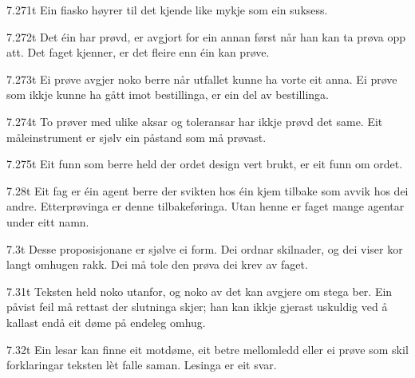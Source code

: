 \begin{formproposition}{7.271}{t}
Ein fiasko høyrer til det kjende like mykje som ein suksess.
\end{formproposition}

\begin{formproposition}{7.272}{t}
Det éin har prøvd, er avgjort for ein annan først når han kan ta prøva opp att. Det faget kjenner, er det fleire enn éin kan prøve.
\end{formproposition}

\begin{formproposition}{7.273}{t}
Ei prøve avgjer noko berre når utfallet kunne ha vorte eit anna. Ei prøve som ikkje kunne ha gått imot bestillinga, er ein del av bestillinga.
\end{formproposition}

\begin{formproposition}{7.274}{t}
To prøver med ulike aksar og toleransar har ikkje prøvd det same. Eit måleinstrument er sjølv ein påstand som må prøvast.
\end{formproposition}

\begin{formproposition}{7.275}{t}
Eit funn som berre held der ordet design vert brukt, er eit funn om ordet.
\end{formproposition}

\begin{formproposition}{7.28}{t}
Eit fag er éin agent berre der svikten hos éin kjem tilbake som avvik hos dei andre. Etterprøvinga er denne tilbakeføringa. Utan henne er faget mange agentar under eitt namn.
\end{formproposition}

\begin{formproposition}{7.3}{t}
Desse proposisjonane er sjølve ei form. Dei ordnar skilnader, og dei viser kor langt omhugen rakk. Dei må tole den prøva dei krev av faget.
\end{formproposition}

\begin{formproposition}{7.31}{t}
Teksten held noko utanfor, og noko av det kan avgjere om stega ber. Ein påvist feil må rettast der slutninga skjer; han kan ikkje gjerast uskuldig ved å kallast endå eit døme på endeleg omhug.
\end{formproposition}

\begin{formproposition}{7.32}{t}
Ein lesar kan finne eit motdøme, eit betre mellomledd eller ei prøve som skil forklaringar teksten lèt falle saman. Lesinga er eit svar.
\end{formproposition}

